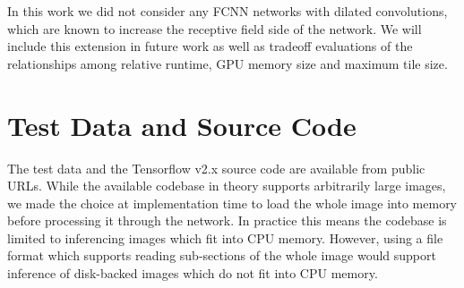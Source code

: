 \documentclass[runningheads]{llncs}
\newif\ifcamera
\begin{document}
In this work we did not consider any FCNN networks with dilated convolutions, which are known to increase the receptive field side of the network. We will include this extension in future work as well as tradeoff evaluations of the relationships among relative runtime, GPU memory size and maximum tile size.




\section{Test Data and Source Code}
The test data and the Tensorflow v2.x source code are available from public URLs\ifcamera\footnote{
\url{https://isg.nist.gov/deepzoomweb/data/stemcellpluripotency} 
\url{https://github.com/usnistgov/semantic-segmentation-unet/tree/ooc-inference}.}\fi.
While the available codebase in theory supports arbitrarily large images, we made the choice at implementation time to load the whole image into memory before processing it through the network. In practice this means the codebase is limited to inferencing images which fit into CPU memory. However, using a file format which supports reading sub-sections of the whole image would support inference of disk-backed images which do not fit into CPU memory. 

\ifcamera
\section{Disclaimer}

Commercial products are identified in this document in order to specify the experimental procedure adequately. Such identification is not intended to imply recommendation or endorsement by NIST, nor is it intended to imply that the products identified are necessarily the best available for the purpose. Analysis performed [in part] on the NIST Enki HPC cluster. Contribution of U.S. government not subject to copyright.
\fi

\clearpage
%
%
{\fontsize{9.0pt}{10.0pt} 
\selectfont



\clearpage

}
\end{document}

